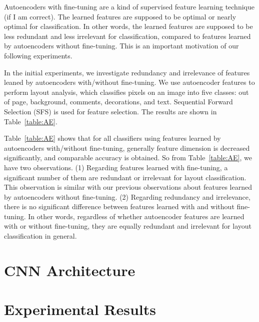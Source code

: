 \documentclass[conference]{IEEEtran}
\begin{document}
Autoencoders with fine-tuning are a kind of supervised feature learning technique (if I am correct).
The learned features are supposed to be optimal or nearly optimal for classification.
In other words, the learned features are supposed to be less redundant and less irrelevant for classification, compared to features learned by autoencoders without fine-tuning.
This is an important motivation of our following experiments.


In the initial experiments, we investigate redundancy and irrelevance of features leaned by autoencoders with/without fine-tuning.
We use autoencoder features to perform layout analysis, which classifies pixels on an image into five classes: out of page, background, comments, decorations, and text.
Sequential Forward Selection (SFS) is used for feature selection.
The results are shown in Table~\ref{table:AE}.

Table~\ref{table:AE} shows that for all classifiers using features learned by autoencoders with/without fine-tuning, generally feature dimension is decreased significantly, and comparable accuracy is obtained.
So from Table~\ref{table:AE}, we have two observations.
(1) Regarding features learned with fine-tuning, a significant number of them are redundant or irrelevant for layout classification.
This observation is similar with our previous observations about features learned by autoencoders without fine-tuning.
(2) Regarding redundancy and irrelevance, there is no significant difference between features learned with and without fine-tuning.
In other words, regardless of whether autoencoder features are learned with or without fine-tuning, they are equally redundant and irrelevant for layout classification in general.







\section{CNN Architecture}


\section{Experimental Results}
\end{document}

